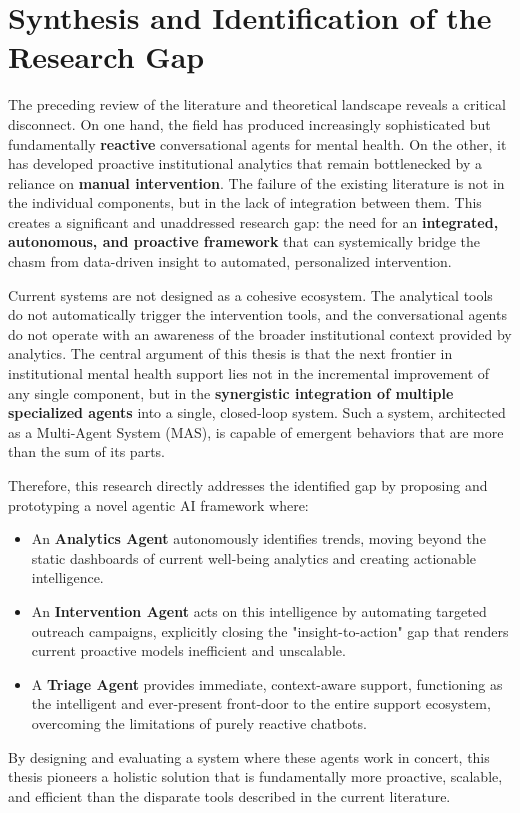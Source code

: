 
\section{Synthesis and Identification of the Research Gap}

The preceding review of the literature and theoretical landscape reveals a critical disconnect. On one hand, the field has produced increasingly sophisticated but fundamentally \textbf{reactive} conversational agents for mental health. On the other, it has developed proactive institutional analytics that remain bottlenecked by a reliance on \textbf{manual intervention}. The failure of the existing literature is not in the individual components, but in the lack of integration between them. This creates a significant and unaddressed research gap: the need for an \textbf{integrated, autonomous, and proactive framework} that can systemically bridge the chasm from data-driven insight to automated, personalized intervention.

Current systems are not designed as a cohesive ecosystem. The analytical tools do not automatically trigger the intervention tools, and the conversational agents do not operate with an awareness of the broader institutional context provided by analytics. The central argument of this thesis is that the next frontier in institutional mental health support lies not in the incremental improvement of any single component, but in the \textbf{synergistic integration of multiple specialized agents} into a single, closed-loop system. Such a system, architected as a Multi-Agent System (MAS), is capable of emergent behaviors that are more than the sum of its parts.

Therefore, this research directly addresses the identified gap by proposing and prototyping a novel agentic AI framework where:
\begin{itemize}
    \item An \textbf{Analytics Agent} autonomously identifies trends, moving beyond the static dashboards of current well-being analytics and creating actionable intelligence.
    \item An \textbf{Intervention Agent} acts on this intelligence by automating targeted outreach campaigns, explicitly closing the "insight-to-action" gap that renders current proactive models inefficient and unscalable.
    \item A \textbf{Triage Agent} provides immediate, context-aware support, functioning as the intelligent and ever-present front-door to the entire support ecosystem, overcoming the limitations of purely reactive chatbots.
\end{itemize}
By designing and evaluating a system where these agents work in concert, this thesis pioneers a holistic solution that is fundamentally more proactive, scalable, and efficient than the disparate tools described in the current literature.
